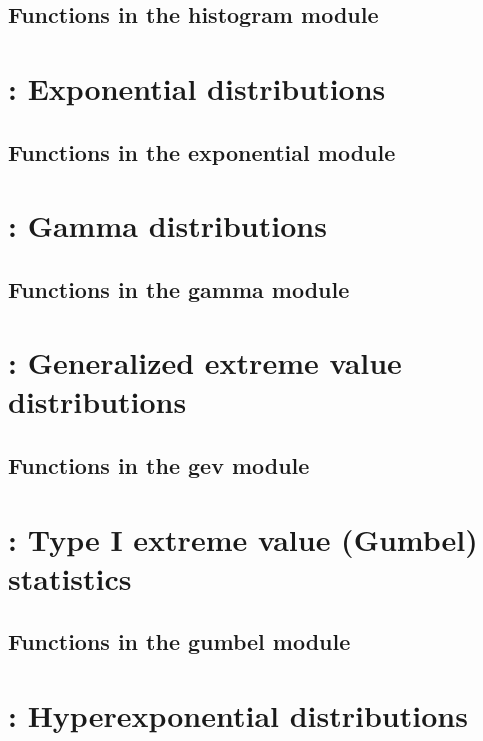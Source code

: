 \documentclass[11pt]{book}
\begin{document}
\subsection{Functions in the histogram module}


\newpage
\section{: Exponential distributions}

\subsection{Functions in the exponential module}


\newpage
\section{: Gamma distributions}

\subsection{Functions in the gamma module}


\newpage
\section{: Generalized extreme value distributions}

\subsection{Functions in the gev module}


\newpage
\section{: Type I extreme value (Gumbel) statistics}

\subsection{Functions in the gumbel module}


\newpage
\section{: Hyperexponential distributions}

\end{document}

